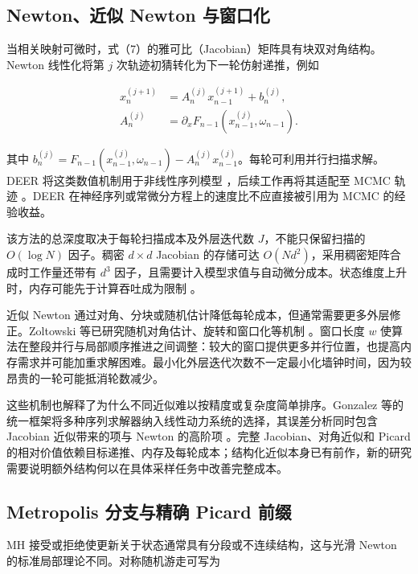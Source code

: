 \documentclass[UTF8,a4paper,zihao=-4,fontset=fandol]{ctexart}
\begin{document}
\subsection{Newton、近似 Newton 与窗口化}

当相关映射可微时，式（7）的雅可比（Jacobian）矩阵具有块双对角结构。Newton 线性化将第 $j$ 次轨迹初猜转化为下一轮仿射递推，例如

\begin{equation}
\begin{aligned}
x_n^{(j+1)}&=A_n^{(j)}x_{n-1}^{(j+1)}+b_n^{(j)},\\
A_n^{(j)}&=\partial_x F_{n-1}(x_{n-1}^{(j)},\omega_{n-1}).
\end{aligned}
\label{eq:9}
\end{equation}

其中 $b_n^{(j)}=F_{n-1}(x_{n-1}^{(j)},\omega_{n-1})-A_n^{(j)}x_{n-1}^{(j)}$。每轮可利用并行扫描求解。DEER 将这类数值机制用于非线性序列模型 \cite{lim2024}，后续工作再将其适配至 MCMC 轨迹 \cite{zoltowski2025}。DEER 在神经序列或常微分方程上的速度比不应直接被引用为 MCMC 的经验收益。

该方法的总深度取决于每轮扫描成本及外层迭代数 $J$，不能只保留扫描的 $O(\log N)$ 因子。稠密 $d\times d$ Jacobian 的存储可达 $O(Nd^2)$，采用稠密矩阵合成时工作量还带有 $d^3$ 因子，且需要计入模型求值与自动微分成本。状态维度上升时，内存可能先于计算吞吐成为限制 \cite{lim2024,gonzalez2026}。

近似 Newton 通过对角、分块或随机估计降低每轮成本，但通常需要更多外层修正。Zoltowski 等已研究随机对角估计、旋转和窗口化等机制 \cite{zoltowski2025}。窗口长度 $w$ 使算法在整段并行与局部顺序推进之间调整：较大的窗口提供更多并行位置，也提高内存需求并可能加重求解困难。最小化外层迭代次数不一定最小化墙钟时间，因为较昂贵的一轮可能抵消轮数减少。

这些机制也解释了为什么不同近似难以按精度或复杂度简单排序。Gonzalez 等的统一框架将多种序列求解器纳入线性动力系统的选择，其误差分析同时包含 Jacobian 近似带来的项与 Newton 的高阶项 \cite{gonzalez2026}。完整 Jacobian、对角近似和 Picard 的相对价值依赖目标递推、内存及每轮成本；结构化近似本身已有前作，新的研究需要说明额外结构何以在具体采样任务中改善完整成本。

\subsection{Metropolis 分支与精确 Picard 前缀}

MH 接受或拒绝使更新关于状态通常具有分段或不连续结构，这与光滑 Newton 的标准局部理论不同。对称随机游走可写为
\end{document}
